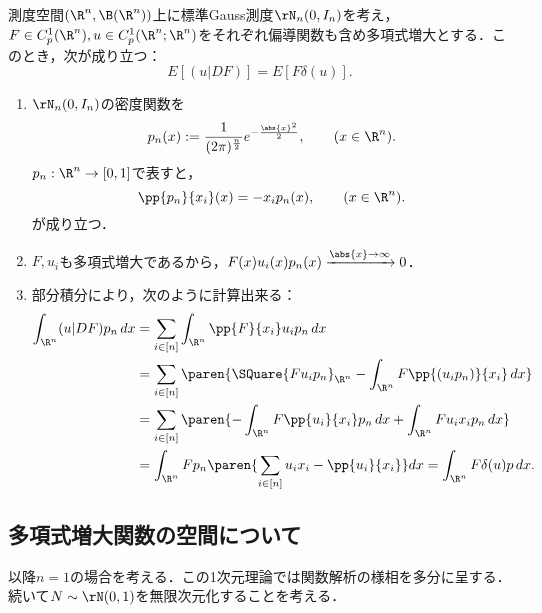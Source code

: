 \documentclass[uplatex,dvipdfmx]{jsreport}
\begin{document}
\begin{proposition}[随伴関係]\label{prop-adjoint-of-Malliavin-Derivative-on-finite-dimensional-Gaussian-space}
    測度空間$(\R^n,\B(\R^n))$上に標準Gauss測度$\rN_n(0,I_n)$を考え，
    $F\in C_p^1(\R^n),u\in C_p^1(\R^n;\R^n)$をそれぞれ偏導関数も含め多項式増大とする．このとき，次が成り立つ：
    \[E[(u|DF)]=E[F\delta(u)].\]
\end{proposition}
\begin{Proof}\mbox{}
    \begin{enumerate}[{Step}1]
        \item $\rN_n(0,I_n)$の密度関数を
        \[p_n(x):=\frac{1}{(2\pi)^{\frac{n}{2}}}e^{-\frac{\abs{x}^2}{2}},\qquad(x\in\R^n).\]
        $p_n:\R^n\to[0,1]$で表すと，
        \[\pp{p_n}{x_i}(x)=-x_ip_n(x),\qquad(x\in\R^n).\]
        が成り立つ．
        \item $F,u_i$も多項式増大であるから，$F(x)u_i(x)p_n(x)\xrightarrow{\abs{x}\to\infty}0$．
        \item 部分積分により，次のように計算出来る：
        \begin{align*}
            \int_{\R^n}(u|DF)p_n\,dx&=\sum_{i\in[n]}\int_{\R^n}\pp{F}{x_i}u_ip_n\,dx\\
            &=\sum_{i\in[n]}\paren{\SQuare{Fu_ip_n}_{\R^n}-\int_{\R^n}F\pp{(u_ip_n)}{x_i}\,dx}\\
            &=\sum_{i\in[n]}\paren{-\int_{\R^n}F\pp{u_i}{x_i}p_n\,dx+\int_{\R^n}Fu_ix_ip_n\,dx}\\
            &=\int_{\R^n}Fp_n\paren{\sum_{i\in[n]}u_ix_i-\pp{u_i}{x_i}}dx=\int_{\R^n}F\delta(u)p\,dx.
        \end{align*}
    \end{enumerate}
\end{Proof}

\subsection{多項式増大関数の空間について}

\begin{tcolorbox}[colframe=ForestGreen, colback=ForestGreen!10!white,breakable,colbacktitle=ForestGreen!40!white,coltitle=black,fonttitle=\bfseries\sffamily,
title=]
    以降$n=1$の場合を考える．この1次元理論では関数解析の様相を多分に呈する．
    続いて$N\sim\rN(0,1)$を無限次元化することを考える\cite{Nourdin-Peccati12-NormalApproximation}．
\end{tcolorbox}
\end{document}

